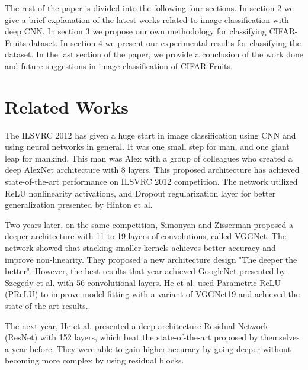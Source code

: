 \documentclass{IEEEtran}
\begin{document}
The rest of the paper is divided into the following four sections. In section 2 we give a brief explanation of the latest works related to image classification with deep CNN. In section 3 we propose our own methodology for classifying CIFAR-Fruits dataset. In section 4 we present our experimental results for classifying the dataset. In the last section of the paper, we provide a conclusion of the work done and future suggestions in image classification of CIFAR-Fruits.

\section{Related Works}

The ILSVRC 2012 has given a huge start in image classification using CNN and using neural networks in general. It was one small step for man, and one giant leap for mankind. This man was Alex with a group of colleagues \cite{Krizhevsky:2012:ICD:2999134.2999257} who created a deep AlexNet architecture with 8 layers. This proposed architecture has achieved state-of-the-art performance on ILSVRC 2012 competition. The network utilized ReLU nonlinearity activations, and Dropout regularization layer for better generalization presented by Hinton et al. \cite{DBLP:journals/corr/abs-1207-0580}

Two years later, on the same competition, Simonyan and Zisserman \cite{DBLP:journals/corr/SimonyanZ14a} proposed a deeper architecture with 11 to 19 layers of convolutions, called VGGNet. The network showed that stacking smaller kernels achieves better accuracy and improve non-linearity. They proposed a new architecture design "The deeper the better". However, the best results that year achieved GoogleNet presented by Szegedy et al. \cite{7298594} with 56 convolutional layers. He et al. \cite{He_2015_ICCV} used Parametric ReLU (PReLU) to improve model fitting with a variant of VGGNet19 and achieved the state-of-the-art results.

The next year, He et al. \cite{He_2016_CVPR} presented a deep architecture Residual Network (ResNet) with 152 layers, which beat the state-of-the-art proposed by themselves a year before. They were able to gain higher accuracy by going deeper without becoming more complex by using residual blocks.
\end{document}
